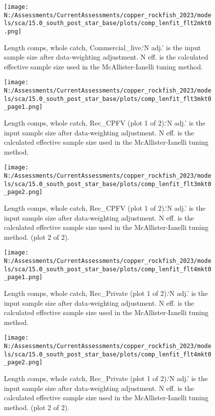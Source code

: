 \documentclass[11pt,
  english,
  letterpaper,
]{article}
\begin{document}
\begin{figure}
\centering
\texttt{[image: N:/Assessments/CurrentAssessments/copper\_rockfish\_2023/models/sca/15.0\_south\_post\_star\_base/plots/comp\_lenfit\_flt2mkt0.png]}
\caption{Length comps, whole catch, Commercial\_live.`N adj.' is the input sample size after data-weighting adjustment. N eff. is the calculated effective sample size used in the McAllister-Ianelli tuning method.\label{fig:comp_lenfit_flt2mkt0}}
\end{figure}

\begin{figure}
\centering
\texttt{[image: N:/Assessments/CurrentAssessments/copper\_rockfish\_2023/models/sca/15.0\_south\_post\_star\_base/plots/comp\_lenfit\_flt3mkt0\_page1.png]}
\caption{Length comps, whole catch, Rec\_CPFV (plot 1 of 2).`N adj.' is the input sample size after data-weighting adjustment. N eff. is the calculated effective sample size used in the McAllister-Ianelli tuning method.\label{fig:comp_lenfit_flt3mkt0_page1}}
\end{figure}

\begin{figure}
\centering
\texttt{[image: N:/Assessments/CurrentAssessments/copper\_rockfish\_2023/models/sca/15.0\_south\_post\_star\_base/plots/comp\_lenfit\_flt3mkt0\_page2.png]}
\caption{Length comps, whole catch, Rec\_CPFV (plot 1 of 2).`N adj.' is the input sample size after data-weighting adjustment. N eff. is the calculated effective sample size used in the McAllister-Ianelli tuning method. (plot 2 of 2).\label{fig:comp_lenfit_flt3mkt0_page2}}
\end{figure}

\begin{figure}
\centering
\texttt{[image: N:/Assessments/CurrentAssessments/copper\_rockfish\_2023/models/sca/15.0\_south\_post\_star\_base/plots/comp\_lenfit\_flt4mkt0\_page1.png]}
\caption{Length comps, whole catch, Rec\_Private (plot 1 of 2).`N adj.' is the input sample size after data-weighting adjustment. N eff. is the calculated effective sample size used in the McAllister-Ianelli tuning method.\label{fig:comp_lenfit_flt4mkt0_page1}}
\end{figure}

\begin{figure}
\centering
\texttt{[image: N:/Assessments/CurrentAssessments/copper\_rockfish\_2023/models/sca/15.0\_south\_post\_star\_base/plots/comp\_lenfit\_flt4mkt0\_page2.png]}
\caption{Length comps, whole catch, Rec\_Private (plot 1 of 2).`N adj.' is the input sample size after data-weighting adjustment. N eff. is the calculated effective sample size used in the McAllister-Ianelli tuning method. (plot 2 of 2).\label{fig:comp_lenfit_flt4mkt0_page2}}
\end{figure}
\end{document}
